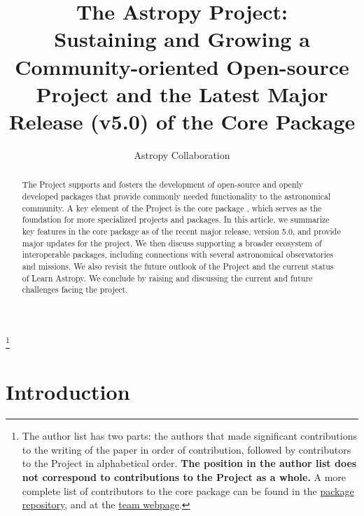 \documentclass[modern]{aastex631}
\begin{document}
\let\oldtoday\today
\renewcommand{\today}{\oldtoday;\qquad\textnormal{\gitHeader}}

\title{The Astropy Project: \\
       Sustaining and Growing a Community-oriented Open-source Project and
       the Latest Major Release (v5.0) of the Core Package}


\author{Astropy Collaboration}
\noaffiliation
{\let\thefootnote\relax\footnote{{The author list has two parts: the authors that made significant contributions to the writing of the paper in order of contribution, followed by contributors to the \astropy Project in alphabetical order. \textbf{The position in the author list does not correspond to contributions to the \astropy Project as a whole.} A more complete list of contributors to the core package can be found in the \href{https://github.com/astropy/astropy/graphs/contributors}{package repository}, and at the \href{http://www.astropy.org/team.html}{\astropy team webpage}.}}}

% 

\begin{abstract}
The \astropy Project supports and fosters the development of open-source and openly developed
\python packages that provide commonly needed functionality to the astronomical
community.
A key element of the \astropy Project is the core package \astropypkg, which serves as the
foundation for more specialized projects and packages.
In this article, we summarize key features in the core package as of the recent major
release, version 5.0, and provide major updates for the project.
We then discuss supporting a broader ecosystem of interoperable packages,
including connections with several astronomical observatories and missions.
We also revisit the future outlook of the \astropy Project and the current
status of Learn Astropy.
We conclude by raising and discussing the current and future challenges facing the project.
\end{abstract}



\section{Introduction} \label{sec:intro}
\end{document}
